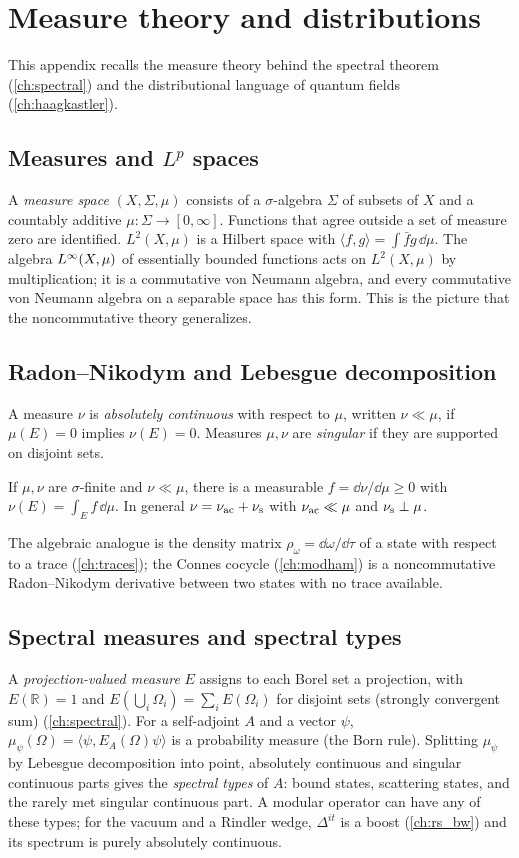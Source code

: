 \chapter{Measure theory and distributions}\label{app:measure}
This appendix recalls the measure theory behind the spectral theorem (\cref{ch:spectral}) and the distributional language of quantum fields (\cref{ch:haagkastler}).

\section{Measures and $L^p$ spaces}
A \emph{measure space} $(X,\Sigma,\mu)$ consists of a $\sigma$-algebra $\Sigma$ of subsets of $X$ and a countably additive $\mu:\Sigma\to[0,\infty]$. Functions that agree outside a set of measure zero are identified. $L^2(X,\mu)$ is a Hilbert space with $\langle f,g\rangle=\int\bar fg\,\dd\mu$. The algebra $L^\infty(X,\mu)$ of essentially bounded functions acts on $L^2(X,\mu)$ by multiplication; it is a commutative von Neumann algebra, and every commutative von Neumann algebra on a separable space has this form. This is the picture that the noncommutative theory generalizes.

\section{Radon--Nikodym and Lebesgue decomposition}
A measure $\nu$ is \emph{absolutely continuous} with respect to $\mu$, written $\nu\ll\mu$, if $\mu(E)=0$ implies $\nu(E)=0$. Measures $\mu,\nu$ are \emph{singular} if they are supported on disjoint sets.
\begin{theorem}
If $\mu,\nu$ are $\sigma$-finite and $\nu\ll\mu$, there is a measurable $f=\dd\nu/\dd\mu\ge0$ with $\nu(E)=\int_Ef\,\dd\mu$. In general $\nu=\nu_{\rm ac}+\nu_{\rm s}$ with $\nu_{\rm ac}\ll\mu$ and $\nu_{\rm s}\perp\mu$.
\end{theorem}
The algebraic analogue is the density matrix $\rho_\omega=\dd\omega/\dd\tau$ of a state with respect to a trace (\cref{ch:traces}); the Connes cocycle (\cref{ch:modham}) is a noncommutative Radon--Nikodym derivative between two states with no trace available.

\section{Spectral measures and spectral types}
A \emph{projection-valued measure} $E$ assigns to each Borel set a projection, with $E(\mathbb R)=1$ and $E(\bigcup_i\Omega_i)=\sum_iE(\Omega_i)$ for disjoint sets (strongly convergent sum) (\cref{ch:spectral}). For a self-adjoint $A$ and a vector $\psi$, $\mu_\psi(\Omega)=\langle\psi,E_A(\Omega)\psi\rangle$ is a probability measure (the Born rule). Splitting $\mu_\psi$ by Lebesgue decomposition into point, absolutely continuous and singular continuous parts gives the \emph{spectral types} of $A$: bound states, scattering states, and the rarely met singular continuous part. A modular operator can have any of these types; for the vacuum and a Rindler wedge, $\Delta^{it}$ is a boost (\cref{ch:rs_bw}) and its spectrum is purely absolutely continuous.

